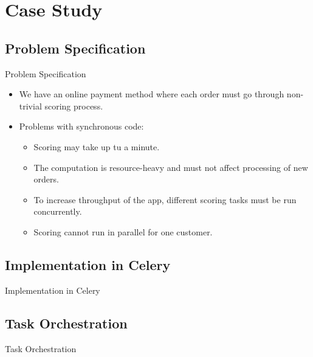 \documentclass[xcolor=x11names,compress,t]{beamer}
\renewcommand{\(}{\begin{columns}[T]}
\renewcommand{\)}{\end{columns}}
\newcommand{\<}[1]{\begin{column}{#1}}
\renewcommand{\>}{\end{column}}
\newenvironment{slide}[1]{\subsection{#1} \begin{frame}{#1}}{\end{frame}}
\begin{document}
\section{Case Study} 
\begin{slide}{Problem Specification}
    \begin{itemize}
        \item We have an online payment method where each order must go through non-trivial scoring process.
        \item Problems with synchronous code:
        \begin{itemize}
            \item Scoring may take up tu a minute.
            \item The computation is resource-heavy and must not affect processing of new orders.
            \item To increase throughput of the app, different scoring tasks must be run concurrently.
            \item Scoring cannot run in parallel for one customer.
        \end{itemize}
    \end{itemize}
\end{slide}

\begin{slide}{Implementation in Celery}

\end{slide}

\begin{slide}{Task Orchestration}
\end{slide} 
\end{document}
